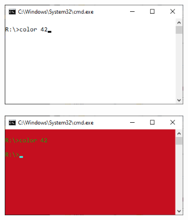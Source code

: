 

\begin{center}
    \begin{minipage}[t]{.49\textwidth}
        \centering
        \includegraphics[width=8cm]{../report_includes/7/white-black-cmd.png}
    \end{minipage}
    \begin{minipage}[t]{.49\textwidth}
        \centering
        \includegraphics[width=8cm]{../report_includes/7/color_42.png}
    \end{minipage}
\end{center}

